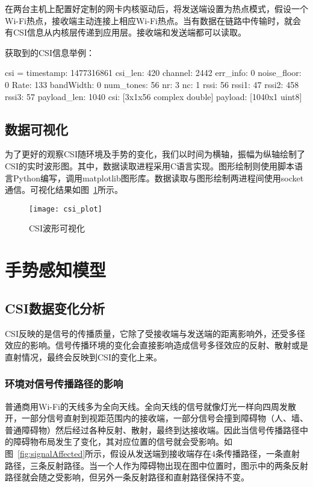 在两台主机上配置好定制的网卡内核驱动后，将发送端设置为热点模式，假设一个Wi-Fi热点，接收端主动连接上相应Wi-Fi热点。当有数据在链路中传输时，就会有CSI信息从内核层传递到应用层。接收端和发送端都可以读取。

获取到的CSI信息举例：
\begin{code}[numbers=none]
 csi = 
 timestamp: 1477316861
 csi_len: 420
 channel: 2442
 err_info: 0
 noise_floor: 0
 Rate: 133
 bandWidth: 0
 num_tones: 56
 nr: 3
 nc: 1
 rssi: 56
 rssi1: 47
 rssi2: 458
 rssi3: 57
 payload_len: 1040
 csi: [3x1x56 complex double]
 payload: [1040x1 uint8]
 \end{code}

\subsection{数据可视化}

为了更好的观察CSI随环境及手势的变化，我们以时间为横轴，振幅为纵轴绘制了CSI的实时波形图。其中，数据读取进程采用C语言实现。图形绘制则使用脚本语言Python编写，调用matplotlib图形库。数据读取与图形绘制两进程间使用socket通信。可视化结果如图~\ref{fig:csi_plot}所示。

\begin{figure}[htbp] %
  \centering
  \texttt{[image: csi\_plot]}
  \caption{CSI波形可视化}
  \label{fig:csi_plot}
\end{figure}

\section{手势感知模型}

\subsection{CSI数据变化分析}
CSI反映的是信号的传播质量，它除了受接收端与发送端的距离影响外，还受多径效应的影响。信号传播环境的变化会直接影响造成信号多径效应的反射、散射或是直射情况，最终会反映到CSI的变化上来。
\subsubsection{环境对信号传播路径的影响}
普通商用Wi-Fi的天线多为全向天线。全向天线的信号就像灯光一样向四周发散开，一部分信号直射到视距范围内的接收端，一部分信号会撞到障碍物（人、墙、普通障碍物）然后经过各种反射、散射，最终到达接收端。因此当信号传播路径中的障碍物布局发生了变化，其对应位置的信号就会受影响。如图~\ref{fig:signalAffected}所示，假设从发送端到接收端存在4条传播路径，一条直射路径，三条反射路径。当一个人作为障碍物出现在图中位置时，图示中的两条反射路径就会随之受影响，但另外一条反射路径和直射路径保持不变。


